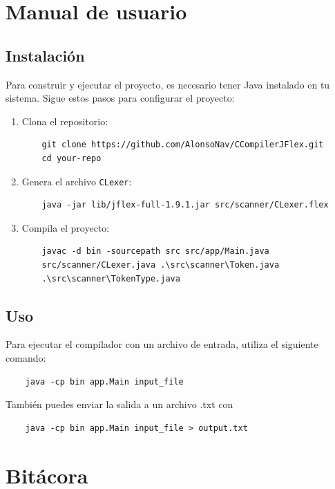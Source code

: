 \documentclass[a4paper,12pt]{article}
\begin{document}
\section*{Manual de usuario}
\subsection*{Instalación}
Para construir y ejecutar el proyecto, es necesario tener Java instalado en tu sistema. Sigue estos pasos para configurar el proyecto:

\begin{enumerate}
    \item Clona el repositorio:
    \begin{verbatim}
    git clone https://github.com/AlonsoNav/CCompilerJFlex.git
    cd your-repo
    \end{verbatim}

    \item Genera el archivo \texttt{CLexer}:
    \begin{verbatim}
    java -jar lib/jflex-full-1.9.1.jar src/scanner/CLexer.flex
    \end{verbatim}

    \item Compila el proyecto:
    \begin{verbatim}
    javac -d bin -sourcepath src src/app/Main.java 
    src/scanner/CLexer.java .\src\scanner\Token.java 
    .\src\scanner\TokenType.java 
    \end{verbatim}
\end{enumerate}

\subsection*{Uso}
Para ejecutar el compilador con un archivo de entrada, utiliza el siguiente comando:
\begin{verbatim}
    java -cp bin app.Main input_file
\end{verbatim}
También puedes enviar la salida a un archivo .txt con
\begin{verbatim}
    java -cp bin app.Main input_file > output.txt
\end{verbatim}

\section*{Bitácora}
\end{document}
